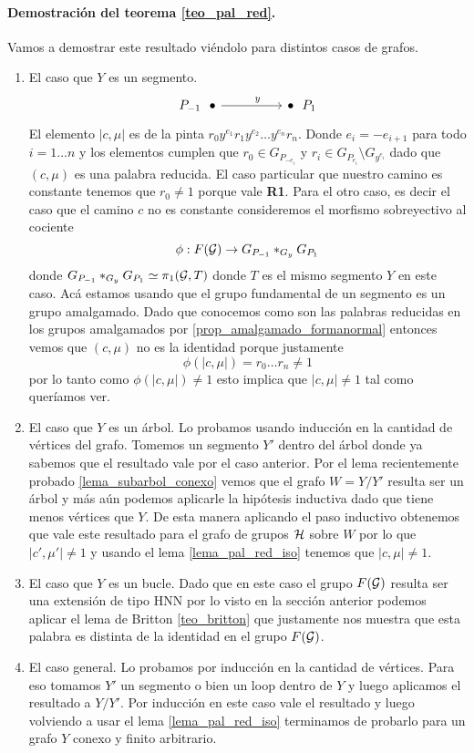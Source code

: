 \documentclass[tesis.tex]{subfiles}
\begin{document}
\paragraph{Demostración del teorema \ref{teo_pal_red}.}
Vamos a demostrar este resultado viéndolo para distintos casos de grafos.
	\begin{enumerate}
		\item El caso que $Y$ es un segmento.
		\[\begin{tikzcd}
			{P_{-1} \ \ \bullet} && {\bullet \ \ P_1}
			\arrow["y"{pos=0.6}, from=1-1, to=1-3]
		\end{tikzcd}\]
		El elemento $|c, \mu|$ es de la pinta $r_0y^{e_1}r_1y^{e_2}\dots y^{e_n}r_n$.
		Donde $e_{i} = -e_{i+1}$ para todo $i=1 \dots n$ y los elementos cumplen que $r_0 \in G_{P_{-e_i}}$ y $r_i \in G_{P_{e_i}} \setminus G_{y^{e_i}}$ dado que $(c, \mu)$ es una palabra reducida.
		El caso particular que nuestro camino es constante tenemos que $r_0 \neq 1$ porque vale \textbf{R1}.
		Para el otro caso, es decir el caso que el camino $c$ no es constante consideremos el morfismo sobreyectivo al cociente 
		\[
			\phi: F({\cal G}) \to G_{P_{-1}} \ast_{G_y} G_{P_1}
		\]
		donde $G_{P_{-1}} \ast_{G_y} G_{P_1} \simeq \pi_1({\cal G}, T)$ donde $T$ es el mismo segmento $Y$ en este caso. 
		Acá estamos usando que el grupo fundamental de un segmento es un grupo amalgamado.
		Dado que conocemos como son las palabras reducidas en los grupos amalgamados por \ref{prop_amalgamado_formanormal} entonces vemos que $(c, \mu)$ no es la identidad porque justamente 
		\[
			\phi(|c,\mu|) = r_0 \dots r_n \neq 1
		\]
		por lo tanto como $\phi(|c,\mu|) \neq 1 $ esto implica que $|c,\mu| \neq 1$ tal como queríamos ver.
		
		\item El caso que $Y$ es un árbol. 
		Lo probamos usando inducción en la cantidad de vértices del grafo.
		Tomemos un segmento $Y'$ dentro del árbol donde ya sabemos que el resultado vale por el caso anterior.
		Por el lema recientemente probado \ref{lema_subarbol_conexo} vemos que el grafo $W = Y / Y'$ resulta ser un árbol y más aún podemos aplicarle la hipótesis inductiva dado que tiene menos vértices que $Y$. 
		De esta manera aplicando el paso inductivo obtenemos que vale este resultado para el grafo de grupos ${\cal H}$ sobre $W$ por lo que $|c',\mu'| \neq 1$ y usando el lema \ref{lema_pal_red_iso} tenemos que $|c, \mu| \neq 1$.
		
		\item El caso que $Y$ es un bucle.
		Dado que en este caso el grupo $F({\cal G})$ resulta ser una extensión de tipo HNN por lo visto en la sección anterior podemos aplicar el lema de Britton \ref{teo_britton} que justamente nos muestra que esta palabra es distinta de la identidad en el grupo $F({\cal G})$.
		
		\item El caso general.
		Lo probamos por inducción en la cantidad de vértices. 
		Para eso tomamos $Y'$ un segmento o bien un loop dentro de $Y$ y luego aplicamos el resultado a $Y/Y'$.
		Por inducción en este caso vale el resultado y luego volviendo a usar el lema \ref{lema_pal_red_iso} terminamos de probarlo para un grafo $Y$ conexo y finito arbitrario.
	\end{enumerate}
\end{document}
